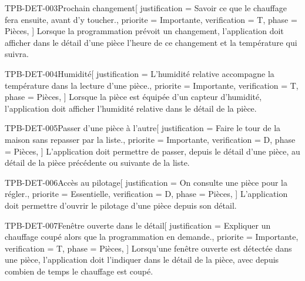 \begin{exigence}{TPB-DET-003}{Prochain changement}[
    justification = {Savoir ce que le chauffage fera ensuite, avant d'y toucher.},
    priorite      = {Importante},
    verification  = {T},
    phase         = {Pièces},
  ]
  Lorsque la programmation prévoit un changement, l'application doit afficher dans le
  détail d'une pièce l'heure de ce changement et la température qui suivra.
\end{exigence}

\begin{exigence}{TPB-DET-004}{Humidité}[
    justification = {L'humidité relative accompagne la température dans la lecture d'une
                     pièce.},
    priorite      = {Importante},
    verification  = {T},
    phase         = {Pièces},
  ]
  Lorsque la pièce est équipée d'un capteur d'humidité, l'application doit afficher
  l'humidité relative dans le détail de la pièce.
\end{exigence}

\begin{exigence}{TPB-DET-005}{Passer d'une pièce à l'autre}[
    justification = {Faire le tour de la maison sans repasser par la liste.},
    priorite      = {Importante},
    verification  = {D},
    phase         = {Pièces},
  ]
  L'application doit permettre de passer, depuis le détail d'une pièce, au détail de la
  pièce précédente ou suivante de la liste.
\end{exigence}

\begin{exigence}{TPB-DET-006}{Accès au pilotage}[
    justification = {On consulte une pièce pour la régler.},
    priorite      = {Essentielle},
    verification  = {D},
    phase         = {Pièces},
  ]
  L'application doit permettre d'ouvrir le pilotage d'une pièce depuis son détail.
\end{exigence}

\begin{exigence}{TPB-DET-007}{Fenêtre ouverte dans le détail}[
    justification = {Expliquer un chauffage coupé alors que la programmation en demande.},
    priorite      = {Importante},
    verification  = {T},
    phase         = {Pièces},
  ]
  Lorsqu'une fenêtre ouverte est détectée dans une pièce, l'application doit l'indiquer
  dans le détail de la pièce, avec depuis combien de temps le chauffage est coupé.
\end{exigence}
